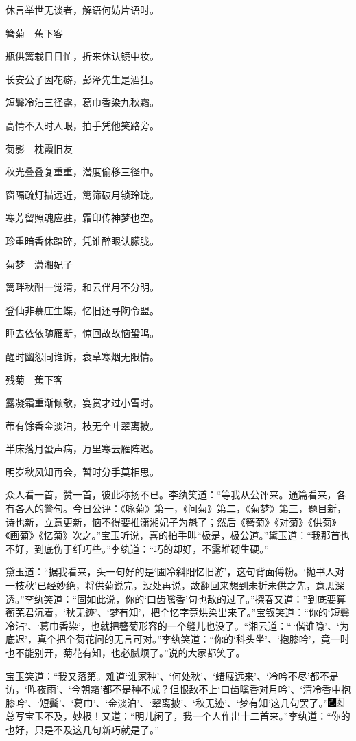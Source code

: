 休言举世无谈者，解语何妨片语时。

簪菊　蕉下客

瓶供篱栽日日忙，折来休认镜中妆。

长安公子因花癖，彭泽先生是酒狂。

短鬓冷沾三径露，葛巾香染九秋霜。

高情不入时人眼，拍手凭他笑路旁。

菊影　枕霞旧友

秋光叠叠复重重，潜度偷移三径中。

窗隔疏灯描远近，篱筛破月锁玲珑。

寒芳留照魂应驻，霜印传神梦也空。

珍重暗香休踏碎，凭谁醉眼认朦胧。

菊梦　潇湘妃子

篱畔秋酣一觉清，和云伴月不分明。

登仙非慕庄生蝶，忆旧还寻陶令盟。

睡去依依随雁断，惊回故故恼蛩鸣。

醒时幽怨同谁诉，衰草寒烟无限情。

残菊　蕉下客

露凝霜重渐倾欹，宴赏才过小雪时。

蒂有馀香金淡泊，枝无全叶翠离披。

半床落月蛩声病，万里寒云雁阵迟。

明岁秋风知再会，暂时分手莫相思。

众人看一首，赞一首，彼此称扬不已。李纨笑道：“等我从公评来。通篇看来，各有各人的警句。今日公评：《咏菊》第一，《问菊》第二，《菊梦》第三，题目新，诗也新，立意更新，恼不得要推潇湘妃子为魁了；然后《簪菊》《对菊》《供菊》《画菊》《忆菊》次之。”宝玉听说，喜的拍手叫“极是，极公道。”黛玉道：“我那首也不好，到底伤于纤巧些。”李纨道：“巧的却好，不露堆砌生硬。”

黛玉道：“据我看来，头一句好的是‘圃冷斜阳忆旧游’，这句背面傅粉。‘抛书人对一枝秋’已经妙绝，将供菊说完，没处再说，故翻回来想到未折未供之先，意思深透。”李纨笑道：“固如此说，你的‘口齿噙香’句也敌的过了。”探春又道：”到底要算蘅芜君沉着，‘秋无迹’、‘梦有知’，把个忆字竟烘染出来了。”宝钗笑道：“你的‘短鬓冷沾’、‘葛巾香染’，也就把簪菊形容的一个缝儿也没了。“湘云道：“\,‘偕谁隐’、‘为底迟’，真个把个菊花问的无言可对。”李纨笑道：“你的‘科头坐’、‘抱膝吟’，竟一时也不能别开，菊花有知，也必腻烦了。”说的大家都笑了。

宝玉笑道：“我又落第。难道‘谁家种’、‘何处秋’、‘蜡屐远来’、‘冷吟不尽’都不是访，‘昨夜雨’、‘今朝霜’都不是种不成？但恨敌不上‘口齿噙香对月吟’、‘清冷香中抱膝吟’、‘短鬓’、‘葛巾’、‘金淡泊’、‘翠离披’、‘秋无迹’、‘梦有知’这几句罢了。”{\includegraphics[width=3mm]{../Images/00003}\includegraphics[width=3mm]{../Images/00012}\footnotesize \kaishu 总写宝玉不及，妙极！}又道：“明儿闲了，我一个人作出十二首来。”李纨道：“你的也好，只是不及这几句新巧就是了。”

